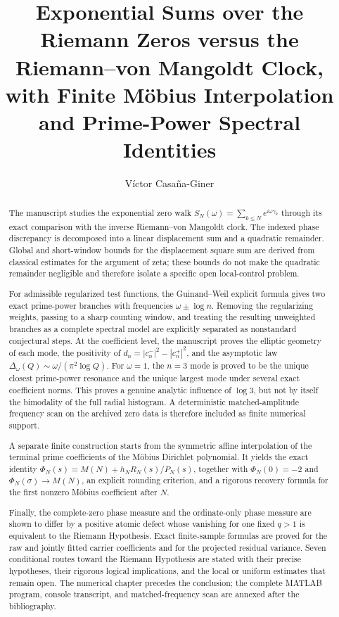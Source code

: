 \documentclass[11pt]{amsart}
\title[Exponential Zeta Walks and Prime-Power Identities]{
Exponential Sums over the Riemann Zeros versus the
Riemann--von Mangoldt Clock, with Finite Möbius Interpolation
and Prime-Power Spectral Identities
}
\author{Víctor Casaña-Giner}
\date{}
\numberwithin{equation}{section}
\theoremstyle{plain}
\theoremstyle{definition}
\theoremstyle{remark}
\newcommand{\1}{\mathbf{1}}
\begin{document}
\begin{abstract}
The manuscript studies the exponential zero walk
\(S_N(\omega)=\sum_{k\leq N}e^{i\omega\gamma_k}\) through its exact
comparison with the inverse Riemann--von Mangoldt clock.  The indexed phase
discrepancy is decomposed into a linear displacement sum and a quadratic
remainder.  Global and short-window bounds for the displacement square sum
are derived from classical estimates for the argument of zeta; these bounds
do not make the quadratic remainder negligible and therefore isolate a
specific open local-control problem.

For admissible regularized test functions, the Guinand--Weil explicit formula
gives two exact prime-power branches with frequencies
\(\omega\pm\log n\).  Removing the regularizing weights, passing to a sharp
counting window, and treating the resulting unweighted branches as a complete
spectral model are explicitly separated as nonstandard conjectural steps.  At
the coefficient level, the manuscript proves the elliptic geometry of each
mode, the positivity of
\(d_n=|c_n^-|^2-|c_n^+|^2\), and the asymptotic law
\(\Delta_\omega(Q)\sim\omega/(\pi^2\log Q)\).  For \(\omega=1\), the
\(n=3\) mode is proved to be the unique closest prime-power resonance and
the unique largest mode under several exact coefficient norms.  This proves
a genuine analytic influence of \(\log3\), but not by itself the bimodality
of the full radial histogram.  A deterministic matched-amplitude frequency
scan on the archived zero data is therefore included as finite numerical
support.

A separate finite construction starts from the symmetric affine interpolation
of the terminal prime coefficients of the Möbius Dirichlet polynomial.  It yields the exact identity
\(\Phi_N(s)=M(N)+h_NR_N(s)/P_N(s)\), together with
\(\Phi_N(0)=-2\) and \(\Phi_N(\sigma)\to M(N)\), an explicit
rounding criterion, and a rigorous recovery formula
for the first nonzero Möbius coefficient after \(N\).

Finally, the complete-zero phase measure and the ordinate-only phase measure
are shown to differ by a positive atomic defect whose vanishing for one fixed
\(q>1\) is equivalent to the Riemann Hypothesis.  Exact finite-sample formulas
are proved for the raw and jointly fitted carrier coefficients and for the
projected residual variance.  Seven conditional routes toward the Riemann
Hypothesis are stated with their precise hypotheses, their rigorous logical
implications, and the local or uniform estimates that remain open.  The
numerical chapter precedes the conclusion; the complete MATLAB program,
console transcript, and matched-frequency scan are annexed after the
bibliography.
\end{abstract}
\end{document}
